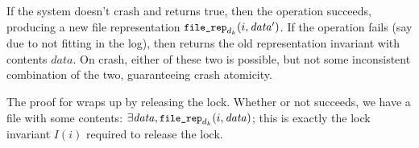 If the system doesn't crash and  returns true, then the operation
succeeds, producing a new file representation
$\cc{file_rep}_{d_{k}}(i, \mathit{data'})$. If the operation fails (say due to
not fitting in the log), then  returns the old representation
invariant with contents $\mathit{data}$. On crash, either of these two is
possible, but not some inconsistent combination of the two, guaranteeing crash atomicity.

The proof for  wraps up by releasing the lock. Whether or not
 succeeds, we have a file with some contents:
$\exists \mathit{data}, \cc{file_rep}_{d_{k}}(i, \mathit{data})$; this is
exactly the lock invariant $I(i)$ required to release the lock.

